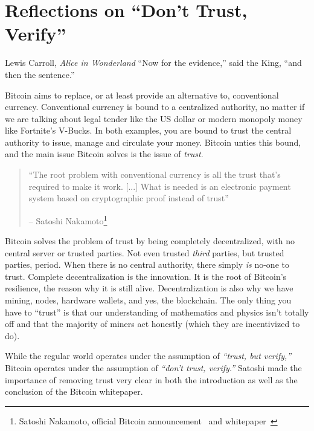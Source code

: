 \chapter{Reflections on \enquote{Don't Trust, Verify}}
\label{les:16}

\begin{chapquote}{Lewis Carroll, \textit{Alice in Wonderland}}
\enquote{Now for the evidence,} said the King, \enquote{and then the sentence.}
\end{chapquote}

Bitcoin aims to replace, or at least provide an alternative to,
conventional currency. Conventional currency is bound to a centralized
authority, no matter if we are talking about legal tender like the US
dollar or modern monopoly money like Fortnite's V-Bucks. In both
examples, you are bound to trust the central authority to issue, manage
and circulate your money. Bitcoin unties this bound, and the main issue
Bitcoin solves is the issue of \textit{trust}.

\begin{quotation}\begin{samepage}
\enquote{The root problem with conventional currency is all the trust that's
required to make it work. [...] What is needed is an electronic
payment system based on cryptographic proof instead of trust}
\begin{flushright} -- Satoshi Nakamoto\footnote{Satoshi Nakamoto, official Bitcoin announcement~\cite{bitcoin-announcement} and whitepaper~\cite{whitepaper}}
\end{flushright}\end{samepage}\end{quotation}

Bitcoin solves the problem of trust by being completely decentralized,
with no central server or trusted parties. Not even trusted \textit{third}
parties, but trusted parties, period. When there is no central
authority, there simply \textit{is} no-one to trust. Complete decentralization
is the innovation. It is the root of Bitcoin's resilience, the reason
why it is still alive. Decentralization is also why we have mining,
nodes, hardware wallets, and yes, the blockchain. The only thing you
have to \enquote{trust} is that our understanding of mathematics and physics
isn't totally off and that the majority of miners act honestly (which
they are incentivized to do).

While the regular world operates under the assumption of \textit{\enquote{trust,
but verify,}} Bitcoin operates under the assumption of \textit{\enquote{don't
trust, verify.}} Satoshi made the importance of removing trust very clear in
both the introduction as well as the conclusion of the Bitcoin whitepaper.

